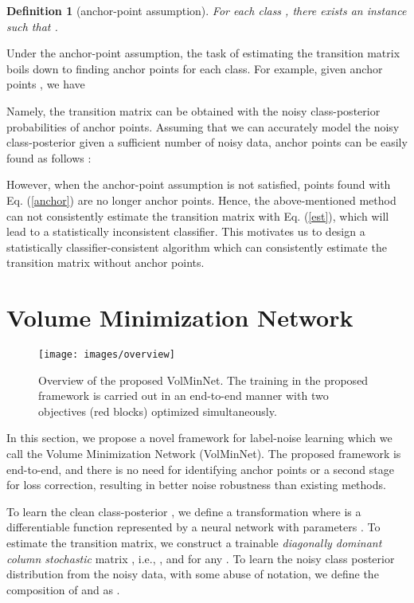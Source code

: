 \documentclass{article}
\newtheorem{definition}{Definition}
\begin{document}
\begin{definition}[anchor-point assumption]
	For each class , there exists an instance  such that .  \end{definition}

 Under the anchor-point assumption, the task of estimating the transition matrix boils down to finding anchor points for each class. For example, given anchor points , we have 


Namely, the transition matrix can be obtained with the noisy class-posterior probabilities of anchor points. Assuming that we can accurately model the noisy class-posterior  given a sufficient number of noisy data, anchor points can be easily found as follows \cite{liu2016classification, patrini2017making}: 

However, when the anchor-point assumption is not satisfied, points found with Eq. (\ref{anchor}) are no longer anchor points. Hence, the above-mentioned method can not consistently estimate the transition matrix with Eq. (\ref{est}), which will lead to a statistically inconsistent classifier. This motivates us to design a statistically classifier-consistent algorithm which can consistently estimate the transition matrix without anchor points. 
 


\section{Volume Minimization Network}

\begin{figure*}[ht]
\begin{center}
	\texttt{[image: images/overview]}
\end{center}
\caption{Overview of the proposed VolMinNet. The training in the proposed framework is carried out in an end-to-end manner with two objectives (red blocks) optimized simultaneously.}
\label{overview}
\end{figure*}

In this section, we propose a novel framework for label-noise learning which we call the Volume Minimization Network (VolMinNet). The proposed framework is end-to-end, and there is no need for identifying anchor points or a second stage for loss correction, resulting in better noise robustness than existing methods.

To learn the clean class-posterior , we define a transformation  where  is a differentiable function represented by a neural network with parameters . To estimate the transition matrix, we construct a trainable \textit{diagonally dominant column stochastic} matrix , i.e., ,   and  for any . To learn the noisy class posterior distribution from the noisy data, with some abuse of notation, we define the composition of  and  as .
\end{document}
